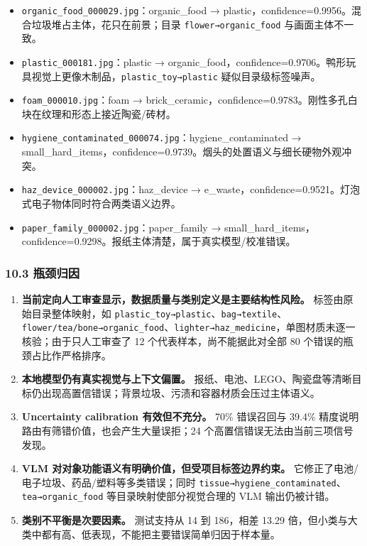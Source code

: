 \documentclass[
  a4paper,
]{article}
\providecommand{\tightlist}{%
  \setlength{\itemsep}{0pt}\setlength{\parskip}{0pt}}
\begin{document}
\begin{itemize}
\tightlist
\item
  \texttt{organic\_food\_000029.jpg}：organic\_food →
  plastic，confidence=0.9956。混合垃圾堆占主体，花只在前景；目录
  \texttt{flower→organic\_food} 与画面主体不一致。
\item
  \texttt{plastic\_000181.jpg}：plastic →
  organic\_food，confidence=0.9706。鸭形玩具视觉上更像木制品，\texttt{plastic\_toy→plastic}
  疑似目录级标签噪声。
\item
  \texttt{foam\_000010.jpg}：foam →
  brick\_ceramic，confidence=0.9783。刚性多孔白块在纹理和形态上接近陶瓷/砖材。
\item
  \texttt{hygiene\_contaminated\_000074.jpg}：hygiene\_contaminated →
  small\_hard\_items，confidence=0.9739。烟头的处置语义与细长硬物外观冲突。
\item
  \texttt{haz\_device\_000002.jpg}：haz\_device →
  e\_waste，confidence=0.9521。灯泡式电子物体同时符合两类语义边界。
\item
  \texttt{paper\_family\_000002.jpg}：paper\_family →
  small\_hard\_items，confidence=0.9298。报纸主体清楚，属于真实模型/校准错误。
\end{itemize}

\hypertarget{103-ux74f6ux9888ux5f52ux56e0}{%
\subsubsection{10.3 瓶颈归因}\label{103-ux74f6ux9888ux5f52ux56e0}}

\begin{enumerate}
\def\labelenumi{\arabic{enumi}.}
\tightlist
\item
  \textbf{当前定向人工审查显示，数据质量与类别定义是主要结构性风险。}
  标签由原始目录整体映射，如
  \texttt{plastic\_toy→plastic}、\texttt{bag→textile}、\texttt{flower/tea/bone→organic\_food}、\texttt{lighter→haz\_medicine}，单图材质未逐一核验；由于只人工审查了
  12 个代表样本，尚不能据此对全部 80 个错误的瓶颈占比作严格排序。
\item
  \textbf{本地模型仍有真实视觉与上下文偏置。}
  报纸、电池、LEGO、陶瓷盘等清晰目标仍出现高置信错误；背景垃圾、污渍和容器材质会压过主体语义。
\item
  \textbf{Uncertainty calibration 有效但不充分。} 70\% 错误召回与 39.4\%
  精度说明路由有筛错价值，也会产生大量误拒；24
  个高置信错误无法由当前三项信号发现。
\item
  \textbf{VLM 对对象功能语义有明确价值，但受项目标签边界约束。}
  它修正了电池/电子垃圾、药品/塑料等多类错误；同时
  \texttt{tissue→hygiene\_contaminated}、\texttt{tea→organic\_food}
  等目录映射使部分视觉合理的 VLM 输出仍被计错。
\item
  \textbf{类别不平衡是次要因素。} 测试支持从 14 到 186，相差 13.29
  倍，但小类与大类中都有高、低表现，不能把主要错误简单归因于样本量。
\end{enumerate}
\end{document}
